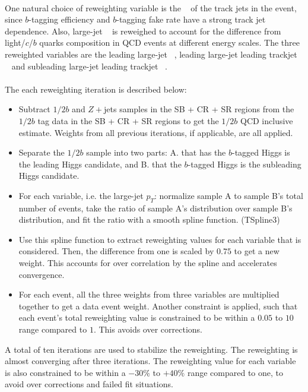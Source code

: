 \paragraph{}
One natural choice of reweighting variable is the \pt~ of the track jets in the event, since $b$-tagging efficiency and $b$-tagging fake rate have a strong track jet \pt~ dependence. 
Also, large-\R jet \pt~ is reweighed to account for the difference from light/$c$/$b$ quarks composition in QCD events at different energy scales.
The three reweighted variables are the leading large-\R jet \pt~, leading large-\R jet leading trackjet \pt~ and subleading large-\R jet leading trackjet \pt~.

\paragraph{}
The each reweighting iteration is described below:
\begin{itemize}
\item Subtract $1/2b$ \ttbar and $Z+$jets samples in the SB + CR + SR regions from the $1/2b$ tag data in the SB + CR + SR regions to get the $1/2b$ QCD inclusive estimate. Weights from all previous iterations, if applicable, are all applied.
\item Separate the $1/2b$ sample into two parts: A. that has the $b$-tagged Higgs is the leading \pt Higgs candidate, and B. that the $b$-tagged Higgs is the subleading \pt Higgs candidate.
\item For each variable, i.e. the large-\R jet $p_{T}$: normalize sample A to sample B's total number of events, take the ratio of sample A's distribution over sample B's distribution, and fit the ratio with a smooth spline function. (TSpline3)
\item Use this spline function to extract reweighting values for each variable that is considered. Then, the difference from one is scaled by $0.75$ to get a new weight. This accounts for over correlation by the spline and accelerates convergence.
\item For each event, all the three weights from three variables are multiplied together to get a data event weight. Another constraint is applied, such that each event's total reweighting value is constrained to be within a $0.05$ to $10$ range compared to $1$. This avoids over corrections.
\end{itemize}
A total of ten iterations are used to stabilize the reweighting. 
The reweighting is almost converging after three iterations.
The reweighting value for each variable is also constrained to be within a $-30\%$ to $+40\%$ range compared to one, to avoid over corrections and failed fit situations.

